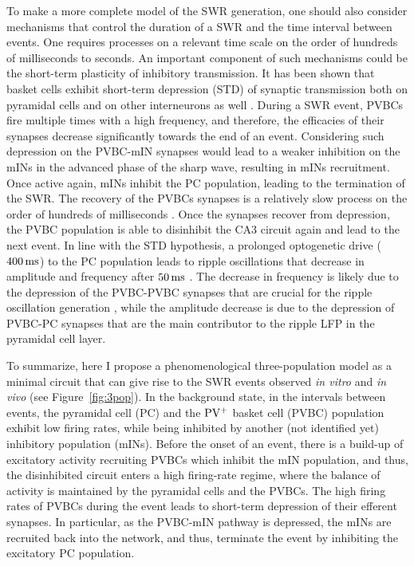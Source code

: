     To make a more complete model of the SWR generation, one should also
    consider mechanisms that control the duration of a SWR and the time
    interval between events. One requires processes on a relevant time scale on
    the order of hundreds of milliseconds to seconds. An important component of
    such mechanisms could be the short-term plasticity of inhibitory
    transmission. It has been shown that basket cells exhibit short-term
    depression (STD) of synaptic transmission both on pyramidal cells and on
    other interneurons as well \citep{Kraushaar2000, Kohus2016}. During a SWR
    event, PVBCs fire multiple times with a high frequency, and therefore, the
    efficacies of their synapses decrease significantly towards the end of an
    event. Considering such depression on the PVBC-mIN synapses would lead to a
    weaker inhibition on the mINs in the advanced phase of the sharp wave,
    resulting in mINs recruitment. Once active again, mINs inhibit the PC
    population, leading to the termination of the SWR. The recovery of the
    PVBCs synapses is a relatively slow process on the order of hundreds of
    milliseconds \citep{Kohus2016}. Once the synapses recover from depression,
    the PVBC population is able to disinhibit the CA3 circuit again and lead to
    the next event. In line with the STD hypothesis, a prolonged optogenetic
    drive ($400\,\rm ms$) to the PC population leads to ripple oscillations
    that decrease in amplitude and frequency after $50\, \rm ms$
    \citep{Stark2014}. The decrease in frequency is likely due to the
    depression of the PVBC-PVBC synapses that are crucial for the ripple
    oscillation generation \citep{Donoso2017}, while the amplitude decrease is
    due to the depression of PVBC-PC synapses that are the main contributor to
    the ripple LFP in the pyramidal cell layer.

    To summarize, here I propose a phenomenological three-population model as a
    minimal circuit that can give rise to the SWR events observed \textit{in
    vitro} and \textit{in vivo} (see Figure~\ref{fig:3pop}). In the background
    state, in the intervals between events, the pyramidal cell (PC) and the
    $\rm PV^+$ basket cell (PVBC) population exhibit low firing rates, while
    being inhibited by another (not identified yet) inhibitory population
    (mINs). Before the onset of an event, there is a build-up of excitatory
    activity recruiting PVBCs which inhibit the mIN population, and thus, the
    disinhibited circuit enters a high firing-rate regime, where the balance of
    activity is maintained by the pyramidal cells and the PVBCs. The high
    firing rates of PVBCs during the event leads to short-term depression of
    their efferent synapses. In particular, as the PVBC-mIN pathway is
    depressed, the mINs are recruited back into the network, and thus,
    terminate the event by inhibiting the excitatory PC population. 

